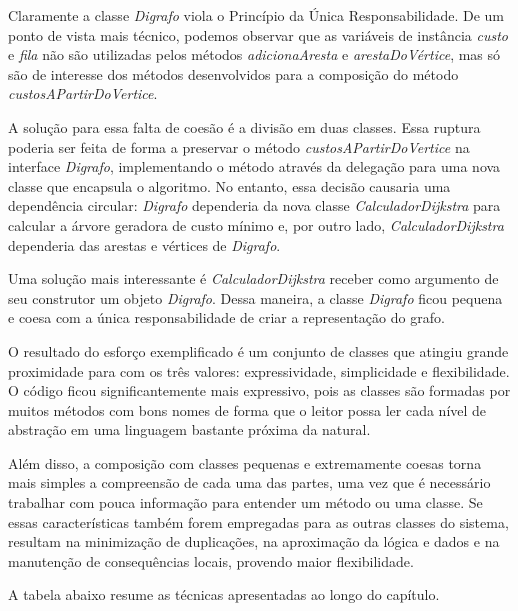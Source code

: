 Claramente a classe \textit{Digrafo} viola o Princípio da Única Responsabilidade. De um ponto de vista mais técnico, 
podemos observar que as variáveis de instância \textit{custo} e \textit{fila} não são utilizadas pelos métodos 
\textit{adicionaAresta} e \textit{arestaDoVértice}, mas só são de interesse dos métodos desenvolvidos para a composição 
do método \textit{custosAPartirDoVertice}.

A solução para essa falta de coesão é a divisão em duas classes. Essa ruptura poderia ser feita de forma a preservar o 
método \textit{custosAPartirDoVertice} na interface \textit{Digrafo}, implementando o método através da delegação para 
uma nova classe que encapsula o algoritmo. No entanto, essa decisão causaria uma dependência circular: \textit{Digrafo} 
dependeria da nova classe \textit{CalculadorDijkstra} para calcular a árvore geradora de custo mínimo e, por outro lado,
\textit{CalculadorDijkstra} dependeria das arestas e vértices de \textit{Digrafo}.

Uma solução mais interessante é \textit{CalculadorDijkstra} receber como argumento de seu construtor um objeto \textit{Digrafo}. Dessa maneira, a classe \textit{Digrafo} ficou pequena e coesa com a única responsabilidade de criar a representação do grafo.


 
O resultado do esforço exemplificado é um conjunto de classes que atingiu grande proximidade para com os três valores: 
expressividade, simplicidade e flexibilidade.
O código ficou significantemente mais expressivo, pois as classes são formadas por muitos métodos com bons nomes de forma que o leitor possa ler cada nível de abstração em uma linguagem bastante próxima da natural.
 
Além disso, a composição com classes pequenas e extremamente coesas torna mais simples a compreensão de cada uma das partes, uma vez que é necessário trabalhar com pouca informação para entender um método ou uma classe. Se essas características também forem empregadas para as outras classes do sistema, resultam na minimização de duplicações, na aproximação da lógica e dados e na manutenção de consequências locais, provendo maior flexibilidade.

A tabela abaixo resume as técnicas apresentadas ao longo do capítulo.

\newenvironment{my_itemize}
{\begin{list}{\labelitemi}
{  \setlength{\itemsep}{0pt}
  \setlength{\parskip}{0pt}
  \setlength{\parsep}{0pt}
  \setlength{\topsep}{0pt}
  \setlength{\partopsep}{0pt}
  \setlength{\leftmargin}{1em}
  \setlength{\rightmargin}{0.5em}
  \setlength{\topmargin}{0.5em}
}
}
{\end{list}}    
     

